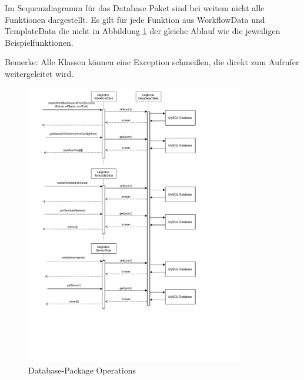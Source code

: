 Im Sequenzdiagramm für das Database Paket sind bei weitem nicht alle Funktionen dargestellt. Es gilt für jede Funktion aus WorkflowData und TemplateData die nicht in Abbildung \ref{fig:databaseSeq} der gleiche Ablauf wie die jeweiligen Beispielfunktionen. 

Bemerke: Alle Klassen können eine Exception schmeißen, die direkt zum Aufrufer weitergeleitet wird.


\begin{figure}[H]
	\centering
	\includegraphics[width=0.85\textwidth]{res/Database_Sequence.drawio.pdf} 
	\caption{Database-Package Operations}
	\label{fig:databaseSeq}
\end{figure}